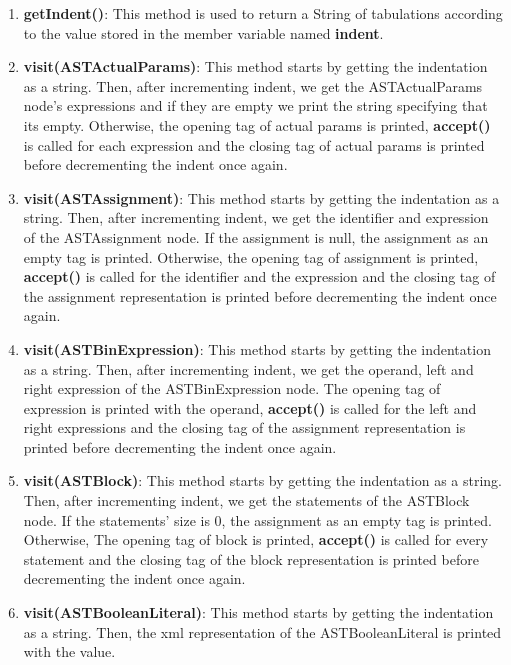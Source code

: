 \documentclass{article}
\begin{document}
				\begin{enumerate}
				\item \textbf{getIndent()}: This method is used to return a String of tabulations according to the value stored in the member variable named \textbf{indent}. 
				\item \textbf{visit(ASTActualParams)}: This method starts by getting the indentation as a string. Then, after incrementing indent, we get the ASTActualParams node's expressions and if they are empty we print the string specifying that its empty. Otherwise, the opening tag of actual params is printed, \textbf{accept()} is called for each expression and the closing tag of actual params is printed before decrementing the indent once again.
				
					\item \textbf{visit(ASTAssignment)}: This method starts by getting the indentation as a string. Then, after incrementing indent, we get the identifier and expression of the ASTAssignment node. If the assignment is null, the assignment as an empty tag is printed. Otherwise, the opening tag of assignment is printed, \textbf{accept()} is called for the identifier and the expression and the closing tag of the assignment representation is printed before decrementing the indent once again.
			
					\item \textbf{visit(ASTBinExpression)}: This method starts by getting the indentation as a string. Then, after incrementing indent, we get the operand, left and right expression of the ASTBinExpression node.  The opening tag of expression is printed with the operand, \textbf{accept()} is called for the left and right expressions and the closing tag of the assignment representation is printed before decrementing the indent once again.		
			
					\item \textbf{visit(ASTBlock)}: This method starts by getting the indentation as a string. Then, after incrementing indent, we get the statements of the ASTBlock node.  If the statements' size is 0, the assignment as an empty tag is printed. Otherwise,  The opening tag of block is printed, \textbf{accept()} is called for every statement and the closing tag of the block representation is printed before decrementing the indent once again.	
			
					\item \textbf{visit(ASTBooleanLiteral)}: This method starts by getting the indentation as a string. Then, the xml representation of the ASTBooleanLiteral is printed with the value.
			

\end{enumerate}
\end{document}
